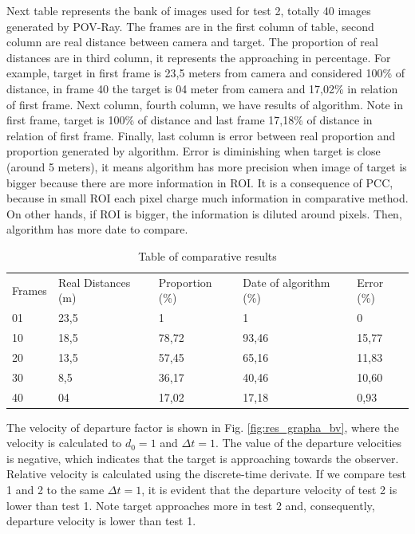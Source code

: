 Next table represents the bank of images used for test 2, totally 40 images generated by POV-Ray.
The frames are in the first column of table, second column are real distance between camera and target.
The proportion of real distances are in third column, it represents the approaching in percentage. For example, 
target in first frame is 23,5 meters from camera and considered 100\% of distance, in frame 40 the target is 04 meter 
from camera and 17,02\% in relation of first frame. Next column, fourth column, we have results of algorithm. 
Note in first frame, target is 100\% of distance and last frame 17,18\% of distance in relation of first frame.
Finally, last column is error between real proportion and proportion generated by algorithm. 
Error is diminishing when target is close (around 5 meters), it means algorithm has more precision 
when image of target is bigger because there are more information in ROI. It is a consequence of PCC, 
because in small ROI each pixel charge much information in comparative method. On other hands, if ROI is bigger,
the information is diluted around pixels. Then, algorithm has more date to compare.

\begin{table}[H]
\setlength{\tabcolsep}{1 pt} 
\caption{Table of comparative results}
\begin{tabular}{lllll}
Frames & Real Distances (m) & Proportion (\%) & Date of algorithm (\%) & Error (\%)\\
01 & 23,5 & 1 & 1 & 0 \\
10 & 18,5 & 78,72 & 93,46 & 15,77 \\
20 & 13,5 & 57,45 & 65,16 & 11,83 \\
30 & 8,5 & 36,17 & 40,46 & 10,60 \\
40 & 04 & 17,02 & 17,18 & 0,93
\end{tabular}
\end{table}

The velocity of departure factor is shown in 
Fig. \ref{fig:res_grapha_bv}, where the velocity is calculated
to $d_0=1$ and $\Delta t=1$. The value of the departure
velocities is negative, which indicates that the
target is approaching towards the observer. Relative velocity is calculated 
using the discrete-time derivate.
If we compare test 1 and 2 to the same $\Delta t=1$, it is evident 
that the departure velocity of  test 2  is lower than test 1. 
Note target approaches more in test 2 and, consequently, departure
velocity is lower than test 1.

